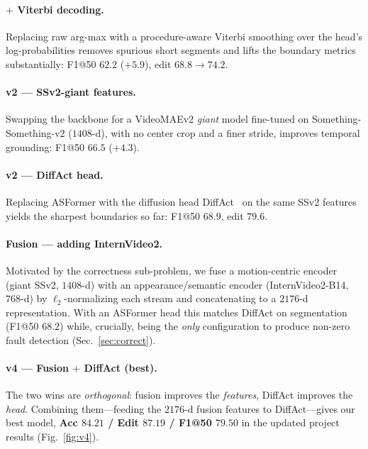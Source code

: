 \documentclass[11pt]{article}
\newcommand{\best}[1]{\textcolor{best}{\textbf{#1}}}
\begin{document}
\paragraph{$+$ Viterbi decoding.}
Replacing raw arg-max with a procedure-aware Viterbi smoothing over the head's log-probabilities removes spurious
short segments and lifts the boundary metrics substantially: F1@50 $62.2$ ($+5.9$), edit $68.8\!\to\!74.2$.

\paragraph{v2 --- SSv2-giant features.}
Swapping the backbone for a VideoMAEv2 \emph{giant} model fine-tuned on Something-Something-v2 ($1408$-d), with
no center crop and a finer stride, improves temporal grounding: F1@50 $66.5$ ($+4.3$).

\paragraph{v2 --- DiffAct head.}
Replacing ASFormer with the diffusion head DiffAct~\cite{diffact} on the same SSv2 features yields the sharpest
boundaries so far: F1@50 $68.9$, edit $79.6$.

\paragraph{Fusion --- adding InternVideo2.}
Motivated by the correctness sub-problem, we fuse a motion-centric encoder (giant SSv2, $1408$-d) with an
appearance/semantic encoder (InternVideo2-B14, $768$-d) by $\ell_2$-normalizing each stream and concatenating to a
$2176$-d representation. With an ASFormer head this matches DiffAct on segmentation (F1@50 $68.2$) while, crucially,
being the \emph{only} configuration to produce non-zero fault detection (Sec.~\ref{sec:correct}).

\paragraph{v4 --- Fusion $+$ DiffAct (best).}
The two wins are \emph{orthogonal}: fusion improves the \emph{features}, DiffAct improves the \emph{head}. Combining
them---feeding the $2176$-d fusion features to DiffAct---gives our best model,
\best{Acc $84.21$ / Edit $87.19$ / F1@50 $79.50$} in the updated project results
(Fig.~\ref{fig:v4}).
\end{document}
